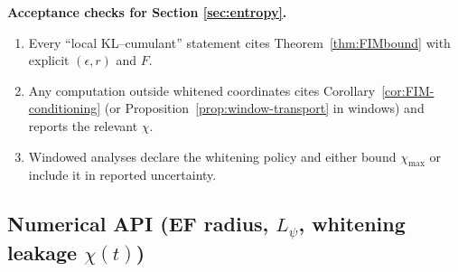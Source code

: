 \documentclass[10pt]{article}
\begin{document}
\begin{mdframed}
\textbf{Acceptance checks for Section \ref{sec:entropy}.}
\begin{enumerate}[leftmargin=*]
\item Every “local KL–cumulant” statement cites Theorem~\ref{thm:FIMbound} with explicit $(\epsilon,r)$ and $F$.
\item Any computation outside whitened coordinates cites Corollary~\ref{cor:FIM-conditioning} (or Proposition~\ref{prop:window-transport} in windows) and reports the relevant $\chi$.
\item Windowed analyses declare the whitening policy and either bound $\chi_{\max}$ or include it in reported uncertainty.
\end{enumerate}
\end{mdframed}

\subsection*{Numerical API (EF radius, $L_\psi$, whitening leakage $\chi(t)$)}
\end{document}
